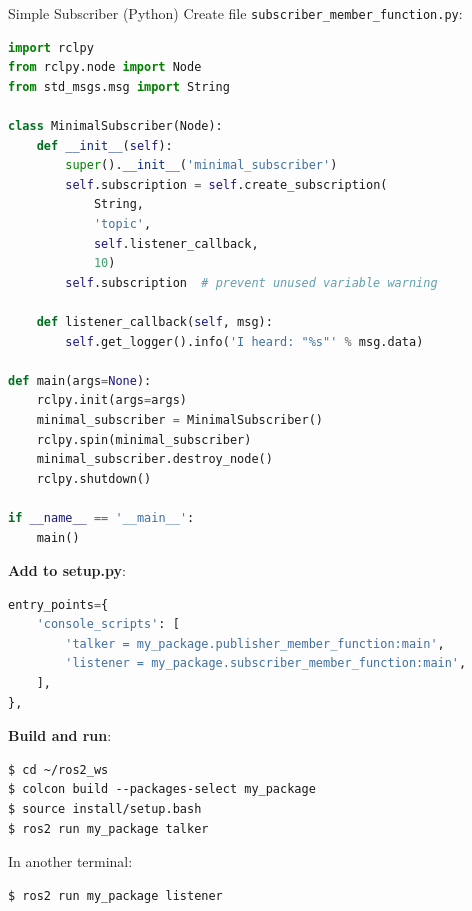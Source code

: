 \begin{frame}{Simple Subscriber (Python)}
    Create file \texttt{subscriber\_member\_function.py}:

    \begin{lstlisting}[language=python]
import rclpy
from rclpy.node import Node
from std_msgs.msg import String

class MinimalSubscriber(Node):
    def __init__(self):
        super().__init__('minimal_subscriber')
        self.subscription = self.create_subscription(
            String,
            'topic',
            self.listener_callback,
            10)
        self.subscription  # prevent unused variable warning

    def listener_callback(self, msg):
        self.get_logger().info('I heard: "%s"' % msg.data)

def main(args=None):
    rclpy.init(args=args)
    minimal_subscriber = MinimalSubscriber()
    rclpy.spin(minimal_subscriber)
    minimal_subscriber.destroy_node()
    rclpy.shutdown()

if __name__ == '__main__':
    main()
\end{lstlisting}

    \framebreak

    \textbf{Add to setup.py}:
    \begin{lstlisting}[language=python]
entry_points={
    'console_scripts': [
        'talker = my_package.publisher_member_function:main',
        'listener = my_package.subscriber_member_function:main',
    ],
},
\end{lstlisting}

    \textbf{Build and run}:
    \begin{lstlisting}[language=shell]
$ cd ~/ros2_ws
$ colcon build --packages-select my_package
$ source install/setup.bash
$ ros2 run my_package talker
\end{lstlisting}

    In another terminal:
    \begin{lstlisting}[language=shell]
$ ros2 run my_package listener
\end{lstlisting}
\end{frame}

